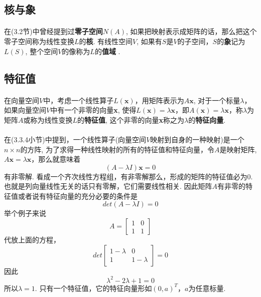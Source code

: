 \subsection{核与象}
\paragraph{}
在(3.2节)中曾经提到过\textbf{零子空间}$N(A)$, 如果把映射表示成矩阵的话，那么把这个零子空间称为线性变换$L$的\textbf{核}. 有线性空间$V$, 如果有$S$是$V$的子空间，$S$的\textbf{象}记为$L(S)$, 整个空间$V$的像称为$L$的\textbf{值域} .

\subsection{特征值}
\paragraph{}
在向量空间$V$中，考虑一个线性算子$L(\textbf{x})$，用矩阵表示为$A\textbf{x}$, 对于一个标量$\lambda$，如果向量空间$V$中有一个非零的向量\textbf{x}, 使得$L(\textbf{x}) = \lambda \textbf{x}$，即$A(\textbf{x}) = \lambda \textbf{x}$，称$\lambda$为矩阵$A$或称为线性变换$L$的\textbf{特征值}, 这个非零的向量\textbf{x}称之为$\lambda$的\textbf{特征向量}.

\paragraph{}
在(3.3.4小节)中提到，一个线性算子(向量空间$V$映射到自身的一种映射)是一个$n\times n$的方阵, 为了求得一种线性映射的所有的特征值和特征向量，令$A$是映射矩阵,
$A \textbf{x} = \lambda \textbf{x}$，那么就意味着
$$
(A - \lambda I) \textbf{x} = 0
$$
有非零解.  看成一个齐次线性方程组，有非零解那么，形成的矩阵的特征值必为0. 也就是列向量线性无关的话只有零解，它们需要线性相关.  因此矩阵$A$有非零的特征值或者说有特征向量的充分必要的条件是
$$
det(A - \lambda I) = 0
$$
举个例子来说
$$
A = \begin{bmatrix}
1 & 0 \\
1 & 1 
\end{bmatrix}
$$
代放上面的方程，
$$
det \begin{bmatrix}
1 - \lambda & 0 \\
1 & 1 - \lambda
\end{bmatrix} = 0
$$
因此
$$
\lambda^2 - 2 \lambda + 1 = 0
$$
所以$\lambda = 1$. 只有一个特征值，它的特征向量形如$(0, a)^T$，$a$为任意标量.





